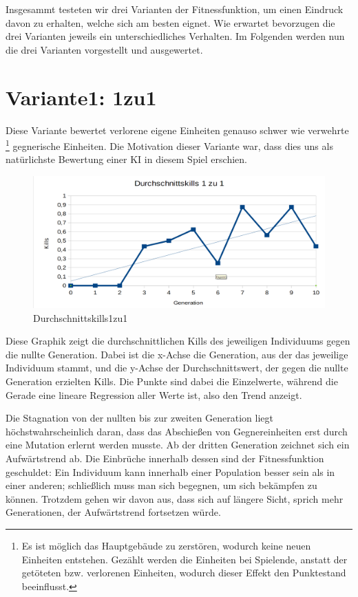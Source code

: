 \documentclass[
	12pt,
	a4paper,
	BCOR10mm,
	DIV14,
	headsepline,
	usegeometry,
]{scrreprt}
\begin{document}
Insgesammt testeten wir drei Varianten der Fitnessfunktion, um einen Eindruck davon zu erhalten, welche sich am besten eignet.
Wie erwartet bevorzugen die drei Varianten jeweils ein unterschiedliches Verhalten.
Im Folgenden werden nun die drei Varianten vorgestellt und ausgewertet.

\section{Variante1: 1zu1}
Diese Variante bewertet verlorene eigene Einheiten genauso schwer wie verwehrte \footnote{Es ist möglich das Hauptgebäude zu zerstören, wodurch keine neuen Einheiten entstehen.
Gezählt werden die Einheiten bei Spielende, anstatt der getöteten bzw. verlorenen Einheiten, wodurch dieser Effekt den Punktestand beeinflusst.} gegnerische Einheiten.
Die Motivation dieser Variante war, dass dies uns als natürlichste Bewertung einer KI in diesem Spiel erschien.

\begin{figure}[h]
	\includegraphics[width = \textwidth]{Durchschnittskills1zu1.png}
	\caption{Durchschnittskills1zu1}
	\label{Durchschnittskills1zu1}
\end{figure}

Diese Graphik zeigt die durchschnittlichen Kills des jeweiligen Individuums gegen die nullte Generation.
Dabei ist die x-Achse die Generation, aus der das jeweilige Individuum stammt, und die y-Achse der Durchschnittswert, der gegen die nullte Generation erzielten Kills.
Die Punkte sind dabei die Einzelwerte, während die Gerade eine lineare Regression aller Werte ist, also den Trend anzeigt.

Die Stagnation von der nullten bis zur zweiten Generation liegt höchstwahrscheinlich daran, dass das Abschießen von Gegnereinheiten erst durch eine Mutation erlernt werden musste.
Ab der dritten Generation zeichnet sich ein Aufwärtstrend ab.
Die Einbrüche innerhalb dessen sind der Fitnessfunktion geschuldet: Ein Individuum kann innerhalb einer Population besser sein als in einer anderen; schließlich muss man sich begegnen, um sich bekämpfen zu können.
Trotzdem gehen wir davon aus, dass sich auf längere Sicht, sprich mehr Generationen, der Aufwärtstrend fortsetzen würde.
\end{document}
